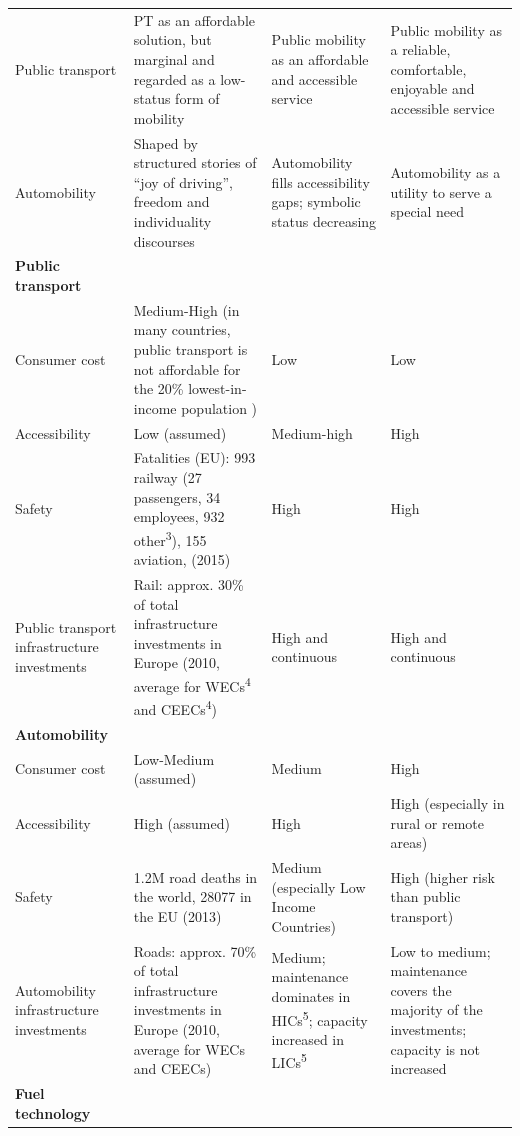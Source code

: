 \begin{landscape}
{\begin{longtable}{p{3cm}p{5cm}p{5cm}p{5cm}}
Public transport & PT as an affordable solution, but marginal and regarded as a low-status form of mobility & Public mobility as an affordable and accessible service & Public mobility as a reliable, comfortable, enjoyable and accessible service \\*
Automobility & Shaped by structured stories of ``joy of driving'', freedom and individuality discourses \parencite{gartman2004_ThreeAgesAutomobile,sheller2012_EmergenceNewCultures} & Automobility fills accessibility gaps; symbolic status decreasing & Automobility as a utility to serve a special need \\\addlinespace
\textbf{Public transport} &  &  &  \\*
Consumer cost & Medium-High (in many countries, public transport is not affordable for the 20\% lowest-in-income population \parencite{carruthers2005_AffordabilityPublicTransport}) & Low & Low \\*
Accessibility & Low (assumed) & Medium-high & High \\*
Safety & Fatalities (EU): 993 railway (27 passengers, 34 employees, 932 other\textsuperscript{3}), 155 aviation, (2015) \parencite{eurostat2017_EurostatOnlineDatabase} & High & High \\*
Public transport infrastructure investments & Rail: approx. 30\% of total infrastructure investments in Europe (2010, average for WECs\textsuperscript{4} and CEECs\textsuperscript{4}) \parencite{kauppila2012_OECDCountriesSpend} & High and continuous & High and continuous \\\addlinespace
\textbf{Automobility} &  &  &  \\*
Consumer cost & Low-Medium (assumed) & Medium & High \\*
Accessibility & High (assumed) & High & High (especially in rural or remote areas) \\*
Safety & 1.2M road deaths in the world, 28077 in the EU (2013) \parencite{who2017_GlobalHealthObservatory} & Medium (especially Low Income Countries) & High (higher risk than public transport) \\*
Automobility infrastructure investments & Roads: approx. 70\% of total infrastructure investments in Europe (2010, average for WECs and CEECs) \parencite{kauppila2012_OECDCountriesSpend} & Medium; maintenance dominates in HICs\textsuperscript{5}; capacity increased in LICs\textsuperscript{5} & Low to medium; maintenance covers the majority of the investments; capacity is not increased \\\addlinespace
\textbf{Fuel technology} &  &  &  \\*

\end{longtable}}
\end{landscape}
